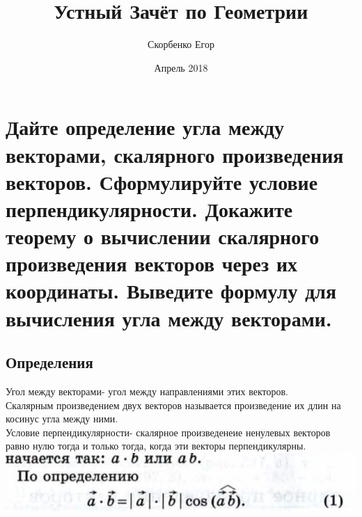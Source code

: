 \documentclass[12pt, letterpaper]{article}
\title{Устный Зачёт по Геометрии}
\author{Скорбенко Егор}
\date{Апрель 2018}
\begin{document}
\maketitle
\tableofcontents

\section {Дайте определение угла между векторами, скалярного произведения векторов. Сформулируйте условие перпендикулярности. Докажите теорему о вычислении скалярного произведения векторов через их координаты. Выведите формулу для вычисления угла между векторами.}
\subsection{Определения}
Угол между векторами- угол между направлениями этих векторов.\\
Скалярным произведением двух векторов называется произведение их длин на косинус угла между ними. \\
Условие перпендикулярности- скалярное произведенеие ненулевых векторов равно нулю тогда и только тогда, когда эти векторы перпендикулярны. \\
\includegraphics[scale=0.3]{photo.jpg} \\
\end{document}
